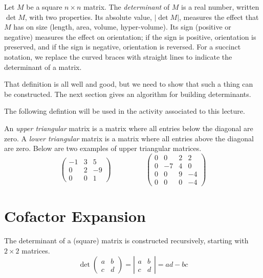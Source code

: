 \documentclass[fleqn]{report}
\begin{document}
\begin{defn}
Let $M$ be a square $n \times n$ matrix. The
\emph{determinant} of $M$ is a real number, written $\det M$,
with two properties. Its absolute value, $|\det M|$, measures
the effect that $M$ has on size (length, area, volume,
hyper-volume). Its sign (positive or negative) measures the
effect on orientation; if the sign is positive, orientation is
preserved, and if the sign is negative, orientation is
reversed. For a succinct notation, we replace the curved
braces with straight lines to indicate the determinant of a
matrix. 
\end{defn}

That definition is all well and good, but we need to show 
that such a thing can be constructed. The next section
gives an algorithm for building determinants.

The following defintion will be used in the activity
associated to this lecture.

\begin{defn}
An \emph{upper triangular} matrix is a matrix where all entries
below the diagonal are zero. A \emph{lower triangular} matrix
is a matrix where all entries above the diagonal are zero.
Below are two examples of upper triangular matrices.
\begin{displaymath}
\left(
\begin{matrix}
-1 & 3 & 5 \\
0 & 2 & -9 \\
0 & 0 & 1 
\end{matrix}
\right)
\hspace{2cm}
\left(
\begin{matrix}
0 & 0 & 2 & 2 \\
0 & -7 & 4 & 0 \\
0 & 0 & 9 & -4 \\
0 & 0 & 0 & -4 
\end{matrix}
\right)
\end{displaymath}
\end{defn}

\section{Cofactor Expansion}
\label{cofactor}

The determinant of a (square) matrix is constructed
recursively, starting with $2 \times 2$ matrices. 
\begin{equation*}
\det \left( \begin{matrix} a & b \\ c & d \end{matrix} \right)
= 
\left| \begin{matrix} a & b \\ c & d \end{matrix} \right| =
ad-bc
\end{equation*}
\end{document}
